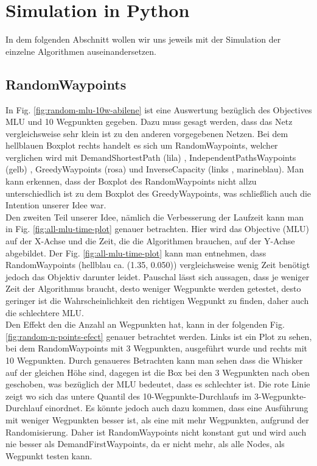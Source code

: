\documentclass[sigconf,noacm,review]{acmart}
\begin{document}
\section{Simulation in Python}
In dem folgenden Abschnitt wollen wir uns jeweils mit der Simulation der einzelne Algorithmen auseinandersetzen.

\subsection{\textbf{RandomWaypoints}}

In Fig. \ref{fig:random-mlu-10w-abilene} ist eine Auswertung bezüglich des Objectives MLU und 10 Wegpunkten gegeben. Dazu muss gesagt werden, dass das Netz vergleichsweise sehr klein ist zu den anderen vorgegebenen Netzen. Bei dem hellblauen Boxplot rechts handelt es sich um RandomWaypoints, welcher verglichen wird mit DemandShortestPath (lila) , IndependentPathsWaypoints (gelb) , GreedyWaypoints (rosa) und InverseCapacity (links , marineblau). Man kann erkennen, dass der Boxplot des RandomWaypoints nicht allzu unterschiedlich ist zu dem Boxplot des GreedyWaypoints, was schließlich auch die Intention unserer Idee war. \\
Den zweiten Teil unserer Idee, nämlich die Verbesserung der Laufzeit kann man in Fig. \ref{fig:all-mlu-time-plot} genauer betrachten. Hier wird das  Objective (MLU) auf der X-Achse und die Zeit, die die Algorithmen brauchen, auf der Y-Achse abgebildet. Der Fig. \ref{fig:all-mlu-time-plot} kann man entnehmen, dass RandomWaypoints (hellblau ca. (1.35, 0.050)) vergleichsweise wenig Zeit benötigt jedoch das Objektiv darunter leidet. Pauschal lässt sich aussagen, dass je weniger Zeit der Algorithmus braucht, desto weniger Wegpunkte  werden getestet, desto geringer ist die Wahrscheinlichkeit den richtigen Wegpunkt zu finden, daher auch die schlechtere MLU.\\ 
Den Effekt den die Anzahl an Wegpunkten hat, kann in der folgenden Fig. \ref{fig:random-n-points-efect} genauer betrachtet werden. Links 
ist ein Plot zu sehen, bei dem RandomWaypoints mit 3 Wegpunkten, ausgeführt wurde und rechts mit 10 Wegpunkten. Durch genaueres Betrachten kann man sehen dass die Whisker auf der gleichen Höhe sind, dagegen ist die Box bei den 3 Wegpunkten nach oben geschoben, was bezüglich der MLU bedeutet, dass es schlechter ist. Die rote Linie zeigt wo sich das untere Quantil des 10-Wegpunkte-Durchlaufs im 3-Wegpunkte-Durchlauf einordnet. Es könnte jedoch auch dazu kommen, dass eine Ausführung mit weniger Wegpunkten besser ist, als eine mit mehr Wegpunkten, aufgrund der Randomisierung. Daher ist RandomWaypoints nicht konstant gut und wird auch nie besser als DemandFirstWaypoints, da er nicht mehr, als alle Nodes, als Wegpunkt testen kann.
\end{document}
